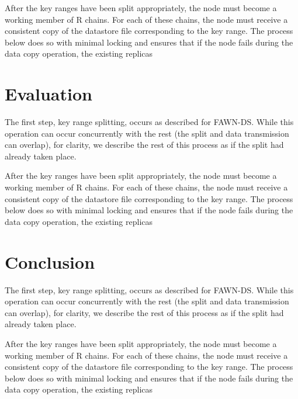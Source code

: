 \documentclass[letterpaper,twocolumn,10pt]{article}
\begin{document}
After the key ranges have been split appropriately, the node
must become a working member of R chains. For each of these chains, the node must receive a consistent copy of the datastore file corresponding to the key range. The process below does so with minimal locking and ensures that if the node fails during the data copy operation, the existing replicas
\section{Evaluation}
The first step, key range splitting, occurs as described for
FAWN-DS. While this operation can occur concurrently with
the rest (the split and data transmission can overlap), for
clarity, we describe the rest of this process as if the split had
already taken place.

After the key ranges have been split appropriately, the node
must become a working member of R chains. For each of these chains, the node must receive a consistent copy of the datastore file corresponding to the key range. The process below does so with minimal locking and ensures that if the node fails during the data copy operation, the existing replicas
\section{Conclusion}
The first step, key range splitting, occurs as described for
FAWN-DS. While this operation can occur concurrently with
the rest (the split and data transmission can overlap), for
clarity, we describe the rest of this process as if the split had
already taken place.

After the key ranges have been split appropriately, the node
must become a working member of R chains. For each of these chains, the node must receive a consistent copy of the datastore file corresponding to the key range. The process below does so with minimal locking and ensures that if the node fails during the data copy operation, the existing replicas

{\footnotesize 
}
\end{document}
